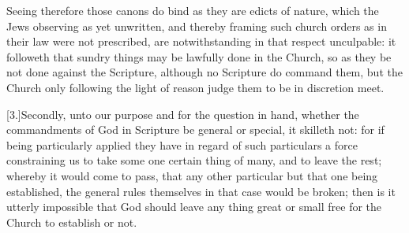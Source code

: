 Seeing therefore those canons do bind as they are edicts of nature, which the Jews observing as yet unwritten, and thereby framing such church orders as in their law were not prescribed, are notwithstanding in that respect unculpable: it followeth that sundry things may be lawfully done in the Church, so as they be not done against the Scripture, although no Scripture do command them, but the Church only following the light of reason judge them to be in discretion meet.

[3.]Secondly, unto our purpose and for the question in hand, whether the commandments of God in Scripture be general or special, it skilleth not: for if being particularly applied they have in regard of such particulars a force constraining us to take some one certain thing of many, and to leave the rest; whereby it would come to pass, that any other particular but that one being established, the general rules themselves in that case would be broken; then is it utterly impossible that God should leave any thing great or small free for the Church to establish or not.

